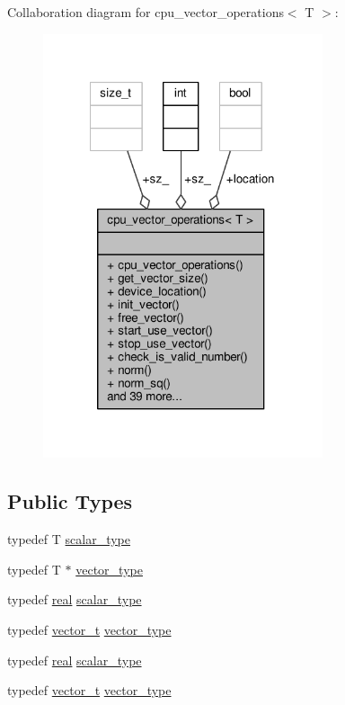 Collaboration diagram for cpu\-\_\-vector\-\_\-operations$<$ T $>$\-:\nopagebreak
\begin{figure}[H]
\begin{center}
\leavevmode
\includegraphics[width=233pt]{structcpu__vector__operations__coll__graph}
\end{center}
\end{figure}
\subsection*{Public Types}
\begin{DoxyCompactItemize}
\item 
typedef T \hyperlink{structcpu__vector__operations_aca6b216aa1fb172df83d98350e94fd61}{scalar\-\_\-type}
\item 
typedef T $\ast$ \hyperlink{structcpu__vector__operations_a1962836df596ce262704d208e9a6d8f9}{vector\-\_\-type}
\item 
typedef \hyperlink{linear__solvers__test_8cpp_a16870095f424ead722dee97d866cc328}{real} \hyperlink{structcpu__vector__operations_ab4a2755f01dbbf6deb948a4cf614eb14}{scalar\-\_\-type}
\item 
typedef \hyperlink{linear__solvers__test_8cpp_a8d0acf9490f363fba134e7c88d751014}{vector\-\_\-t} \hyperlink{structcpu__vector__operations_a8abfbd321d471a507c010da28fd97178}{vector\-\_\-type}
\item 
typedef \hyperlink{linear__solvers__test_8cpp_a16870095f424ead722dee97d866cc328}{real} \hyperlink{structcpu__vector__operations_ab4a2755f01dbbf6deb948a4cf614eb14}{scalar\-\_\-type}
\item 
typedef \hyperlink{linear__solvers__test_8cpp_a8d0acf9490f363fba134e7c88d751014}{vector\-\_\-t} \hyperlink{structcpu__vector__operations_a8abfbd321d471a507c010da28fd97178}{vector\-\_\-type}
\end{DoxyCompactItemize}
